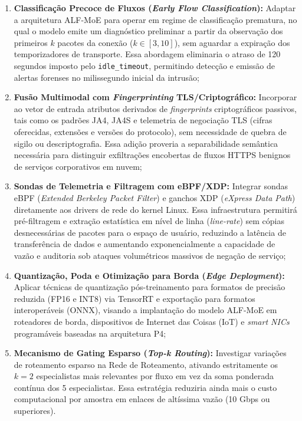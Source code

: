 \begin{enumerate}
    \item \textbf{Classificação Precoce de Fluxos (\emph{Early Flow Classification}):}
    Adaptar a arquitetura ALF-MoE para operar em regime de classificação prematura, no qual o modelo emite um diagnóstico preliminar a partir da observação dos primeiros $k$ pacotes da conexão ($k \in [3, 10]$), sem aguardar a expiração dos temporizadores de transporte. Essa abordagem eliminaria o atraso de 120 segundos imposto pelo \texttt{idle\_timeout}, permitindo detecção e emissão de alertas forenses no milissegundo inicial da intrusão;
    
    \item \textbf{Fusão Multimodal com \emph{Fingerprinting} TLS/Criptográfico:}
    Incorporar ao vetor de entrada atributos derivados de \emph{fingerprints} criptográficos passivos, tais como os padrões JA4, JA4S e telemetria de negociação TLS (cifras oferecidas, extensões e versões do protocolo), sem necessidade de quebra de sigilo ou descriptografia. Essa adição proveria a separabilidade semântica necessária para distinguir exfiltrações encobertas de fluxos HTTPS benignos de serviços corporativos em nuvem;
    
    \item \textbf{Sondas de Telemetria e Filtragem com eBPF/XDP:}
    Integrar sondas eBPF (\emph{Extended Berkeley Packet Filter}) e ganchos XDP (\emph{eXpress Data Path}) diretamente aos drivers de rede do kernel Linux. Essa infraestrutura permitirá pré-filtragem e extração estatística em nível de linha (\emph{line-rate}) sem cópias desnecessárias de pacotes para o espaço de usuário, reduzindo a latência de transferência de dados e aumentando exponencialmente a capacidade de vazão e auditoria sob ataques volumétricos massivos de negação de serviço;
    
    \item \textbf{Quantização, Poda e Otimização para Borda (\emph{Edge Deployment}):}
    Aplicar técnicas de quantização pós-treinamento para formatos de precisão reduzida (FP16 e INT8) via TensorRT e exportação para formatos interoperáveis (ONNX), visando a implantação do modelo ALF-MoE em roteadores de borda, dispositivos de Internet das Coisas (IoT) e \emph{smart NICs} programáveis baseadas na arquitetura P4;
    
    \item \textbf{Mecanismo de Gating Esparso (\emph{Top-k Routing}):}
    Investigar variações de roteamento esparso na Rede de Roteamento, ativando estritamente os $k=2$ especialistas mais relevantes por fluxo em vez da soma ponderada contínua dos 5 especialistas. Essa estratégia reduziria ainda mais o custo computacional por amostra em enlaces de altíssima vazão (10 Gbps ou superiores).
\end{enumerate}
